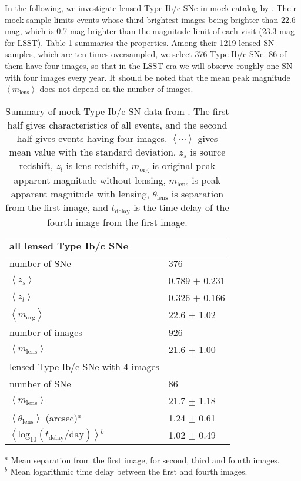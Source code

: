 \documentclass[useAMS,usenatbib,twocolumn]{mnras}
\begin{document}
In the following, we investigate lensed Type Ib/c SNe in mock catalog
by \cite{ogur10}.  Their mock sample limits events whose third
brightest images being brighter than 22.6 mag, which is 0.7 mag
brighter than the magnitude limit of each visit (23.3 mag for LSST).
Table \ref{tab} summaries the properties.  Among their 1219 lensed SN
samples, which are ten times oversampled, we select 376 Type Ib/c
SNe. 86 of them have four images, so that in the LSST era we will
observe roughly one SN with four images every year. It should be noted
that the mean peak magnitude $\left<m_\mathrm{lens}\right>$ does not
depend on the number of images.

\begin{table}
\caption{Summary of mock Type Ib/c SN data from \citet{ogur10}. The
  first half gives characteristics of all events, and the second half
  gives events having four images. $\left<\cdots\right>$ gives mean
  value with the standard deviation. $z_s$ is source redshift, $z_l$
  is lens redshift, $m_\mathrm{org}$ is original peak apparent
  magnitude without lensing, $m_\mathrm{lens}$ is peak apparent
  magnitude with lensing, $\theta_\mathrm{lens}$ is separation from
  the first image, and $t_\mathrm{delay}$ is the time delay of the
  fourth image from the first image.}  
\centering
\begin{tabular}{ll}
\hline
 all lensed Type Ib/c SNe\\
 \hline
 number of SNe &         376 \\
$\left<z_s\right>$ & 0.789 $\pm$ 0.231\\
$\left<z_l\right>$ & 0.326 $\pm$ 0.166\\
$\left<m_\mathrm{org}\right>$ &  22.6 $\pm$  1.02\\
 number of images &         926 \\
$\left<m_\mathrm{lens}\right>$ &  21.6 $\pm$  1.00\\
 \hline
 lensed Type Ib/c SNe with 4 images\\
 \hline
 number of SNe &          86 \\
$\left<m_\mathrm{lens}\right>$ &  21.7 $\pm$  1.18\\
$\left<\theta_\mathrm{lens}\right>$ (arcsec)$^a$ &  1.24 $\pm$  0.61\\
$\left<\mathrm{log}_{10}(t_\mathrm{delay}/\mathrm{day})\right>$$^b$ &  1.02 $\pm$  0.49\\
\hline
\end{tabular}
\label{tab}
\begin{flushleft}
$^a$ Mean separation from the first image, for second, third and fourth images.\\
$^b$ Mean logarithmic time delay between the first and fourth images.
\end{flushleft}
\end{table}%
\end{document}

